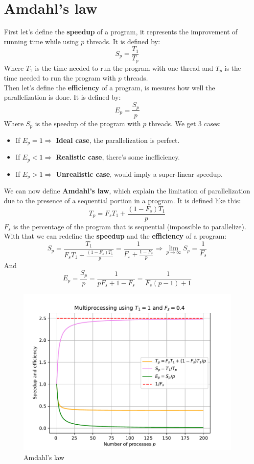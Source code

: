 \documentclass[12pt, openany]{report}
\theoremstyle{definition}
\begin{document}
\section{Amdahl's law}
First let's define the \textbf{speedup} of a program, it represents the improvement of running time while using $p$ threads. It is defined by:
\begin{equation}
	S_p = \frac{T_1}{T_p}
\end{equation}
Where $T_1$ is the time needed to run the program with one thread and $T_p$ is the time needed to run the program with $p$ threads.\\
Then let's define the \textbf{efficiency} of a program, is mesures how well the parallelization is done. It is defined by:
\begin{equation}
	E_p = \frac{S_p}{p}
\end{equation}
Where $S_p$ is the speedup of the program with $p$ threads. We get 3 cases:
\begin{itemize}
	\item If $E_p = 1 \Rightarrow$ \textbf{Ideal case}, the parallelization is perfect.
	\item If $E_p < 1 \Rightarrow$ \textbf{Realistic case}, there's some inefficiency.
	\item If $E_p > 1 \Rightarrow$ \textbf{Unrealistic case}, would imply a super-linear speedup.
\end{itemize}
We can now define \textbf{Amdahl's law}, which explain the limitation of parallelization due to the presence of a sequential portion in a program. It is defined like this:
\begin{equation}
	T_p = F_sT_1 + \frac{(1 - F_s)T_1}{p}
\end{equation}
$F_s$ is the percentage of the program that is sequential (impossible to parallelize). With that we can redefine the \textbf{speedup} and the \textbf{efficiency} of a program:
\begin{equation}
	S_p = \frac{T_1}{F_sT_1 + \frac{(1 - F_s)T_1}{p}} = \frac{1}{F_s + \frac{1 - F_s}{p}} \Rightarrow \lim_{p \to \infty} S_p = \frac{1}{F_s}
\end{equation}
And
\begin{equation}
	E_p = \frac{S_p}{p} = \frac{1}{pF_s + 1 - F_s} = \frac{1}{F_s(p - 1) + 1}
\end{equation}
\begin{figure}[H]
	\centering
	\includegraphics[width=0.8\linewidth]{img/amdahl.pdf}
	\caption{Amdahl's law}
	\label{fig:amdahl}
\end{figure}
\end{document}
